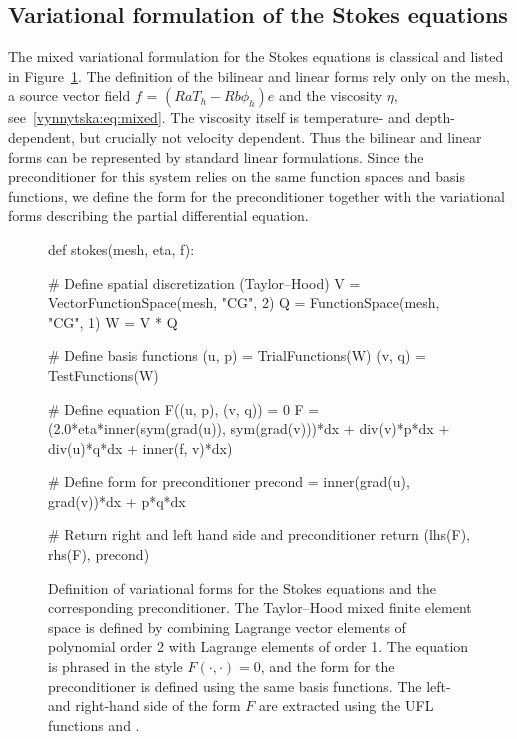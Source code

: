 \subsection{Variational formulation of the Stokes equations}

The mixed variational formulation for the Stokes equations is
classical and listed in Figure~\ref{vynnytska:fig:stokes}. The
definition of the bilinear and linear forms rely only on the mesh, a
source vector field $f$ = $(Ra T_h - Rb \phi_h) e$ and the viscosity
$\eta$, see~\eqref{vynnytska:eq:mixed}.  The viscosity itself is
temperature- and depth-dependent, but crucially not velocity
dependent.  Thus the bilinear and linear forms can be represented by
standard linear formulations.  Since the preconditioner for this
system relies on the same function spaces and basis functions, we
define the form for the preconditioner together with the variational
forms describing the partial differential equation.
\begin{figure}
  \begin{python}
def stokes(mesh, eta, f):

    # Define spatial discretization (Taylor--Hood)
    V = VectorFunctionSpace(mesh, "CG", 2)
    Q = FunctionSpace(mesh, "CG", 1)
    W = V * Q

    # Define basis functions
    (u, p) = TrialFunctions(W)
    (v, q) = TestFunctions(W)

    # Define equation F((u, p), (v, q)) = 0
    F = (2.0*eta*inner(sym(grad(u)), sym(grad(v)))*dx
         + div(v)*p*dx
         + div(u)*q*dx
         + inner(f, v)*dx)

    # Define form for preconditioner
    precond = inner(grad(u), grad(v))*dx + p*q*dx

    # Return right and left hand side and preconditioner
    return (lhs(F), rhs(F), precond)
  \end{python}

  \caption{Definition of variational forms for the Stokes equations
    and the corresponding preconditioner. The Taylor--Hood mixed
    finite element space is defined by combining Lagrange vector
    elements of polynomial order 2 with Lagrange elements of order
    1. The equation is phrased in the style $F(\cdot, \cdot) = 0$, and
    the form for the preconditioner is defined using the same basis
    functions. The left- and right-hand side of the form $F$ are
    extracted using the UFL functions 
    and .}
  \label{vynnytska:fig:stokes}
\end{figure}

